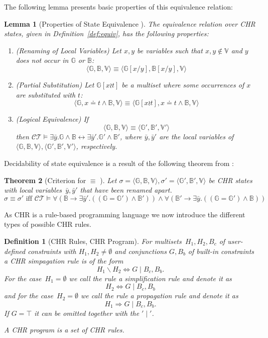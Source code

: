 \documentclass{tlp}
\newtheorem{theorem}{Theorem}\newtheorem{corollary}[theorem]{Corollary}
\newtheorem{lemma}[theorem]{Lemma}
\newtheorem{definition}{Definition}[section]
\newcommand{\st}[3]{\ensuremath{\langle #1 , #2 , #3 \rangle}}
\newcommand{\CT}{\ensuremath{\mathcal{CT}}}
\newcommand{\bbB}{\ensuremath{\mathbb{B}}}
\newcommand{\bbG}{\ensuremath{\mathbb{G}}}
\newcommand{\bbV}{\ensuremath{\mathbb{V}}}
\newcommand{\psubxt}{\left[x\wr t\right] }
\newcommand{\subxy}{\left[x/y\right] }
\begin{document}
The following lemma presents basic properties of this equivalence relation:

\begin{lemma}[Properties of State Equivalence \cite{Raiser2009a}]
\label{lem:equiv_props}
The equivalence relation over CHR states, given in Definition~\ref{def:equiv},
has the following properties:

\begin{enumerate}
\item \label{prop:rename} \emph{(Renaming of Local Variables)} Let $x,y$ be
variables such that $x,y\not\in\bbV$ and $y$ does not occur in $\bbG$ or $\bbB$:
\[
	\st{\bbG}{\bbB}{\bbV} \equiv \st{\bbG\subxy}{\bbB\subxy}{\bbV}
\]
\item \label{prop:partial} \emph{(Partial Substitution)} Let $\bbG\psubxt$ be a
multiset where \emph{some} occurrences of $x$ are substituted with $t$:
\[
	\st{\bbG}{x \doteq t \land \bbB}{\bbV} \equiv
	\st{\bbG\psubxt}{x \doteq t \land \bbB}{\bbV}
\]
\item \label{prop:lequiv} \emph{(Logical Equivalence)} If
\[
	\st{\bbG}{\bbB}{\bbV} \equiv \st{\bbG'}{\bbB'}{\bbV'}
\]
then $\CT \models \exists \bar y.\bbG \land \bbB \leftrightarrow
\exists \bar y'.\bbG' \land \bbB'$,  where $\bar y,\bar y'$ are the local
variables of $\st{\bbG}{\bbB}{\bbV},  \st{\bbG'}{\bbB'}{\bbV'}$, respectively.
\end{enumerate}
\end{lemma}

Decidability of state equivalence is a result of the following theorem from
\cite{Raiser2009a}:

\begin{theorem}[Criterion for $\equiv$ \cite{Raiser2009a}]\label{thm:equiv_tf} Let
$\sigma = \st{\bbG}{\bbB}{\bbV}, \sigma' = \st{\bbG'}{\bbB'}{\bbV}$ be CHR states with
local variables~$\bar y,\bar y'$ that have been renamed apart.\[ \sigma \equiv
\sigma' \text{ iff } \CT \models \forall (\bbB \rightarrow \exists
\bar y'. ((\bbG = \bbG') \land \bbB')) \land \forall (\bbB' \rightarrow \exists
\bar y.((\bbG = \bbG') \land \bbB)) \]
\end{theorem}

As CHR is a rule-based programming language we now introduce the different
types of possible CHR rules.

\begin{definition}[CHR Rules, CHR Program]\label{def:rules}
For multisets~$H_1,H_2,B_c$ of user-defined constraints with $H_1, H_2
\ne \emptyset$ and conjunctions $G,B_b$ of built-in constraints a CHR
\emph{simpagation} rule is of the form
\[
H_1 \backslash H_2 \Leftrightarrow G \mid B_c,B_b.
\]
For the case~$H_1 = \emptyset$ we call the rule a \emph{simplification} rule
and denote it as
\[
H_2 \Leftrightarrow G \mid B_c,B_b
\]
and for the case~$H_2 = \emptyset$ we call the rule a \emph{propagation} rule
and denote it as
\[
H_1 \Rightarrow G \mid B_c,B_b.
\]
If $G = \top$ it can be omitted together with the $'\mid'$.

A \emph{CHR program} is a set of CHR rules.
\end{definition}
\end{document}
